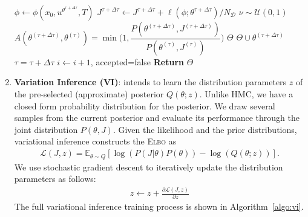 \begin{enumerate}
\begin{algorithm}[H]
\begin{algorithmic}[1]
                    \State $\phi \leftarrow \phi(x_0, u^{\theta^{\tau + \Delta \tau}}, T) $
                    \State $J^{\tau + \Delta \tau}  \gets J^{\tau + \Delta \tau}  + \ell(\phi; \theta^{\tau + \Delta \tau})/N_{\mathcal{D}}$ 
                \EndFor
                \State $\nu \sim \mathcal{U}(0, 1)$
                \State $A(\theta^{(\tau + \Delta \tau)}, \theta^{(\tau)}) = \min \Biggl(1, \dfrac{P(\theta^{(\tau + \Delta \tau)}, J^{(\tau + \Delta \tau)})}{P(\theta^{(\tau)}, J^{(\tau)})} \Biggr)$
                    \State $\Theta$ \leftarrow \; $\Theta \cup \theta^{(\tau + \Delta \tau)}$ 
                    \State $\tau = \tau + \Delta \tau$
                    \Else
                    \State $i \leftarrow i + 1$, accepted=false
                \EndIf
            \EndWhile
        \EndWhile
        \State \textbf{Return} $\Theta$
        \end{algorithmic}
    \end{algorithm}

    \item \textbf{Variation Inference (VI)}: intends to learn the distribution parameters $z$ of the pre-selected (approximate) posterior $Q(\theta; z)$.
    Unlike HMC, we have a closed form probability distribution for the posterior.
    We draw several samples from the current posterior and evaluate its performance through the joint distribution $P(\theta, J)$. 
    Given the likelihood and the prior distributions, variational inference constructs the \textsc{Elbo} as
    \begin{align}
        \mathcal{L}(J,z) = \mathbb{E}_{\theta \sim Q} \left[\log(P(J | \theta)P(\theta)) - \log(Q(\theta;z)) \right].    
        \label{eq:neuralpbc_elbo}    
    \end{align}
    We use stochastic gradient descent to iteratively update the distribution parameters as follows:
    \begin{align*}
      z \leftarrow z + \frac{ \partial \mathcal{L}(J,z)}{\partial z}
    \end{align*}
    The full variational inference training process is shown in Algorithm~\eqref{algo:vi}.
    

\end{enumerate}
